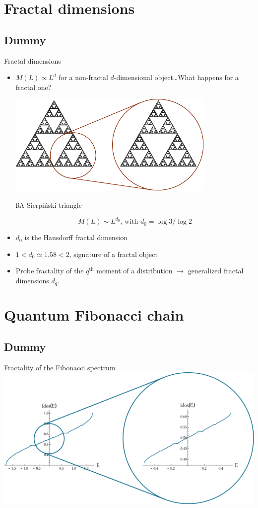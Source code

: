 \section{Fractal dimensions}
\subsection{Dummy}
\begin{frame}{Fractal dimensions}
\begin{itemize}
	\item $M(L) \propto L^d$ for a non-fractal $d$-dimensional object\dots What happens for a fractal one?
	
	{\centering
	\includegraphics[width=.4\textwidth]{img/sierpinski}
	
	{\ss A Sierpiński triangle}
	
	}
	
	\[
		M(L) \sim L^{d_0} \text{, with } d_0 = \log 3/\log 2
	\]
	
	\item $d_0$ is the Hausdorff fractal dimension
	\item $1 < d_0 \simeq 1.58 < 2$, signature of a fractal object
	\item Probe fractality of the $q^\text{th}$ moment of a distribution $\to$ generalized fractal dimensions $d_q$.
\end{itemize}
\end{frame}

\section{Quantum Fibonacci chain}
\subsection{Dummy}
\begin{frame}{Fractality of the Fibonacci spectrum}
\centering
\includegraphics[width=1.\textwidth]{img/idos}	

\end{frame}

